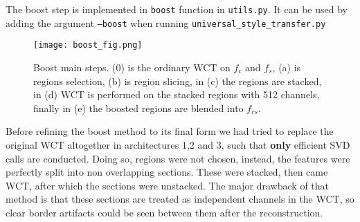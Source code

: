 The boost step is implemented in \texttt{boost} function in \texttt{utils.py}. It can be used by adding the argument \texttt{--boost} when running \texttt{universal\_style\_transfer.py}\\

\begin{figure}[h!]
	\centering
	\texttt{[image: boost\_fig.png]}
	\caption{Boost main steps. (0) is the ordinary WCT on $f_c$ and $f_s$, (a) is regions selection, (b) is region slicing, in (c) the regions are stacked, in (d) WCT is performed on the stacked regions with 512 channels, finally in (e) the boosted regions are blended into $f_{cs}$.}
	\label{fig:boost}
\end{figure}

Before refining the boost method to its final form we had tried to replace the original WCT altogether in architectures 1,2 and 3, such that \textbf{only} efficient SVD calls are conducted. Doing so, regions were not chosen, instead, the features were perfectly split into non overlapping sections. These were stacked, then came WCT, after which the sections were unstacked. The major drawback of that method is that these sections are treated as independent channels in the WCT, so clear border artifacts could be seen between them after the reconstruction. 

